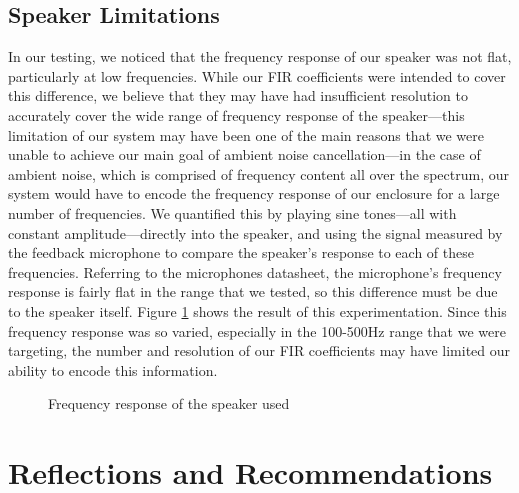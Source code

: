 \documentclass{fpgairpods}
\begin{document}
\subsection{Speaker Limitations}
In our testing, we noticed that the frequency response of our speaker was not flat, particularly at low frequencies. While our FIR coefficients were intended to cover this difference, we believe that they may have had insufficient resolution to accurately cover the wide range of frequency response of the speaker---this limitation of our system may have been one of the main reasons that we were unable to achieve our main goal of ambient noise cancellation---in the case of ambient noise, which is comprised of frequency content all over the spectrum, our system would have to encode the frequency response of our enclosure for a large number of frequencies. We quantified this by playing sine tones---all with constant amplitude---directly into the speaker, and using the signal measured by the feedback microphone to compare the speaker's response to each of these frequencies. Referring to the microphones datasheet, the microphone's frequency response is fairly flat in the range that we tested, so this difference must be due to the speaker itself. Figure \ref{chart:speaker_response} shows the result of this experimentation. Since this frequency response was so varied, especially in the 100-500Hz range that we were targeting, the number and resolution of our FIR coefficients may have limited our ability to encode this information. 

\begin{figure}
    \centering
    \caption{Frequency response of the speaker used}
    \label{chart:speaker_response}
\end{figure}

\section{Reflections and Recommendations}
\end{document}
